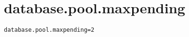 \section{database.pool.maxpending}
\label{configuration:DatabasePoolMaxpending}
\AvailableInJavaOnly{\TODO}
\begin{lstlisting}[style=Props,caption={Usage example for \textit{database.pool.maxpending}}]
database.pool.maxpending=2
\end{lstlisting}